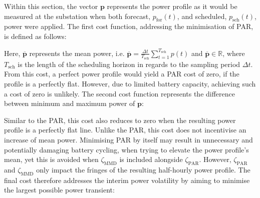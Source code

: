 

Within this section, the vector $\textbf{p}$ represents the power profile as it would be measured at the substation when both forecast, $p_\text{for}(t)$, and scheduled, $p_\text{sch}(t)$, power were applied.
The first cost function, addressing the minimisation of PAR, is defined as follows:





Here, $\overline{\textbf{p}}$ represents the mean power, i.e. $\overline{\textbf{p}} = \frac{\Delta t}{T_\text{sch}}\sum_{t=1}^{T_\text{sch}}p(t)$ and $\overline{\textbf{p}} \in \mathbb{R}$, where $T_\text{sch}$ is the length of the scheduling horizon in regards to the sampling period $\Delta t$.
From this cost, a perfect power profile would yield a PAR cost of zero, if the profile is a perfectly flat.
However, due to limited battery capacity, achieving such a cost of zero is unlikely.
The second cost function represents the difference between minimum and maximum power of $\textbf{p}$:




Similar to the PAR, this cost also reduces to zero when the resulting power profile is a perfectly flat line.
Unlike the PAR, this cost does not incentivise an increase of mean power.
Minimising PAR by itself may result in unnecessary and potentially damaging battery cycling, when trying to elevate the power profile's mean, yet this is avoided when $\zeta_\text{MMD}$ is included alongside $\zeta_\text{PAR}$.
However, $\zeta_\text{PAR}$ and $\zeta_\text{MMD}$ only impact the fringes of the resulting half-hourly power profile.
The final cost therefore addresses the interim power volatility by aiming to minimise the largest possible power transient:


